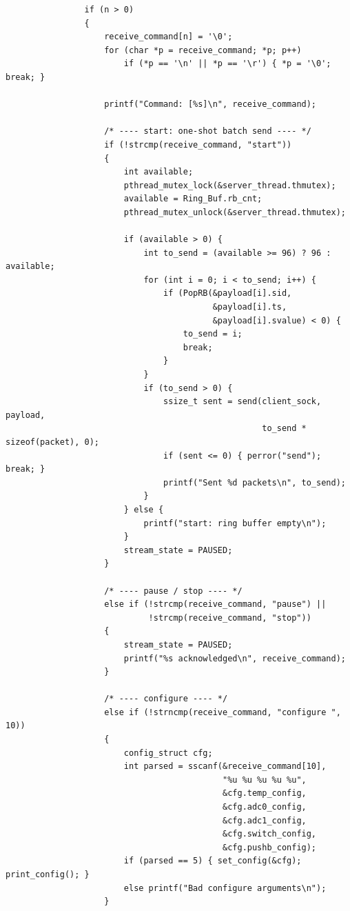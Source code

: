 \begin{verbatim}
                if (n > 0)
                {
                    receive_command[n] = '\0';
                    for (char *p = receive_command; *p; p++)
                        if (*p == '\n' || *p == '\r') { *p = '\0'; break; }
    
                    printf("Command: [%s]\n", receive_command);
    
                    /* ---- start: one-shot batch send ---- */
                    if (!strcmp(receive_command, "start"))
                    {
                        int available;
                        pthread_mutex_lock(&server_thread.thmutex);
                        available = Ring_Buf.rb_cnt;
                        pthread_mutex_unlock(&server_thread.thmutex);
    
                        if (available > 0) {
                            int to_send = (available >= 96) ? 96 : available;
                            for (int i = 0; i < to_send; i++) {
                                if (PopRB(&payload[i].sid,
                                          &payload[i].ts,
                                          &payload[i].svalue) < 0) {
                                    to_send = i;
                                    break;
                                }
                            }
                            if (to_send > 0) {
                                ssize_t sent = send(client_sock, payload,
                                                    to_send * sizeof(packet), 0);
                                if (sent <= 0) { perror("send"); break; }
                                printf("Sent %d packets\n", to_send);
                            }
                        } else {
                            printf("start: ring buffer empty\n");
                        }
                        stream_state = PAUSED;
                    }
    
                    /* ---- pause / stop ---- */
                    else if (!strcmp(receive_command, "pause") ||
                             !strcmp(receive_command, "stop"))
                    {
                        stream_state = PAUSED;
                        printf("%s acknowledged\n", receive_command);
                    }
    
                    /* ---- configure ---- */
                    else if (!strncmp(receive_command, "configure ", 10))
                    {
                        config_struct cfg;
                        int parsed = sscanf(&receive_command[10],
                                            "%u %u %u %u %u",
                                            &cfg.temp_config,
                                            &cfg.adc0_config,
                                            &cfg.adc1_config,
                                            &cfg.switch_config,
                                            &cfg.pushb_config);
                        if (parsed == 5) { set_config(&cfg); print_config(); }
                        else printf("Bad configure arguments\n");
                    }
    

\end{verbatim}
